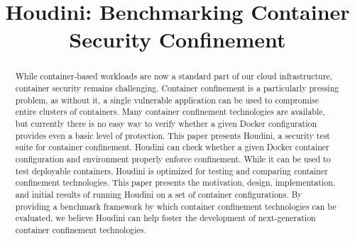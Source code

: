 \documentclass[conference]{IEEEtran}
\begin{document}
\newcommand{\cmark}{\textcolor{green}{\ding{51}}}  %
\newcommand{\xmark}{\textcolor{red}{\ding{55}}}    %


\title{Houdini: Benchmarking Container\\ Security Confinement}


\maketitle
\thispagestyle{plain}
\pagestyle{plain}
\begin{abstract}
  While container-based workloads are now a standard part of our cloud infrastructure, container security remains challenging. Container confinement is a particularly pressing problem, as without it, a single vulnerable application can be used to compromise entire clusters of containers. Many container confinement technologies are available, but currently there is no easy way to verify whether a given Docker configuration provides even a basic level of protection. This paper presents Houdini, a security test suite for container confinement. Houdini can check whether a given Docker container configuration and environment properly enforce confinement. While it can be used to test deployable containers, Houdini is optimized for testing and comparing container confinement technologies. This paper presents the motivation, design, implementation, and initial results of running Houdini on a set of container configurations. By providing a benchmark framework by which container confinement technologies can be evaluated, we believe Houdini can help foster the development of next-generation container confinement technologies.
\end{abstract}














\end{document}
